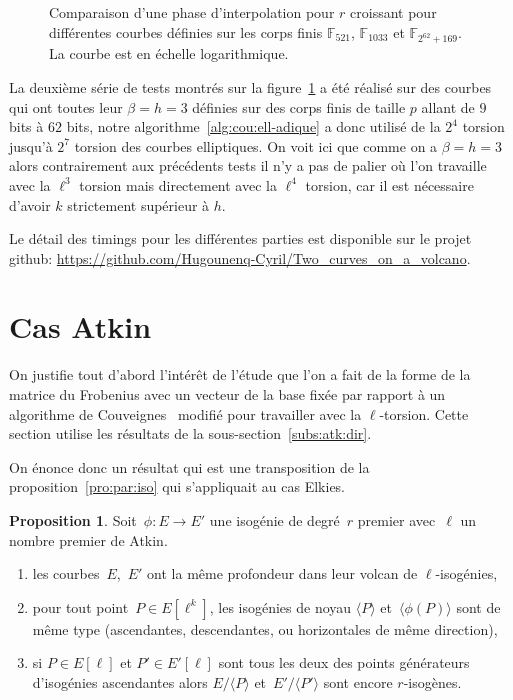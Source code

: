 \documentclass[10pt,a4paper]{book}
\theoremstyle{plain}
\theoremstyle{definition}
\theoremstyle{definition}
\theoremstyle{definition}
\newtheorem{prop}[thm]{Proposition}
\theoremstyle{definition}
\theoremstyle{remark}
\theoremstyle{remark}
\theoremstyle{definition}
\begin{document}
\begin{figure}
\label{fig:exp:niv}
%
\caption{Comparaison d'une phase d'interpolation pour $r$ croissant pour différentes courbes définies sur les corps finis $\mathbb{F}_{521}$, $\mathbb{F}_{1033}$ et $\mathbb{F}_{2^{62}+169 }$. La courbe est en échelle logarithmique.}
\end{figure}

La deuxième série de tests montrés sur la figure~\ref{fig:exp:niv} a été réalisé
sur des courbes qui ont toutes leur $\beta=h=3$ définies sur des corps finis de
taille $p$ allant de $9$ bits à $62$ bits, notre algorithme~\ref{alg:cou:ell-adique} a donc utilisé de la 
$2^4$ torsion jusqu'à $2^7$ torsion des courbes elliptiques. On voit ici que comme on a 
$\beta=h=3$ alors contrairement aux précédents tests il n'y a pas de palier où l'on travaille avec la 
$\ell^{3}$ torsion mais directement avec la $\ell^4$ torsion, car il est 
nécessaire d'avoir $k$ strictement supérieur à $h$.

Le détail des timings pour les 
différentes parties est disponible sur le projet github: 
\url{https://github.com/Hugounenq-Cyril/Two_curves_on_a_volcano}. 

\section{Cas Atkin}
\label{sec:Atk:Con}
On justifie tout d'abord l'intérêt de l'étude que l'on a fait de la forme de 
la matrice du Frobenius avec un vecteur de la base fixée par rapport à un 
algorithme de Couveignes~\cite{Couveignes96} modifié pour travailler avec la
$\ell$-torsion. Cette section utilise les résultats de la 
sous-section~\ref{subs:atk:dir}.

On énonce donc un résultat qui est une transposition de la 
proposition~\ref{pro:par:iso} qui s'appliquait au cas Elkies.

\begin{prop}\label{pro:par:iso:atk}
Soit~$\phi: E \rightarrow E'$ une isogénie de degré~$r$ premier avec~$\ell$ un 
nombre premier de Atkin.
\begin{enumerate}
\item les courbes~$E$,~$E'$ ont la même profondeur dans leur volcan de
 $\ell$-isogénies,
\item\label{pro:par:fun:atk} pour tout point~$P \in E[\ell^k]$,
les isogénies de noyau $\langle P \rangle$ et~$\langle \phi(P) \rangle$ sont de
même type (ascendantes, descendantes, ou horizontales de même direction),
\item\label{pro:par:asc:atk} si $P \in E[\ell]$ et $P' \in E'[\ell]$ sont tous 
les deux des points générateurs d'isogénies ascendantes alors $E/\langle P 
\rangle$ et~$E'/\langle P' \rangle$ sont encore $r$-isogènes.
\end{enumerate}
\end{prop}
\end{document}
